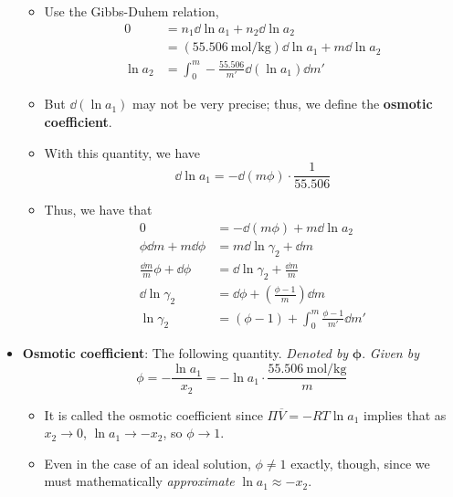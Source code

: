 \documentclass[../notes.tex]{subfiles}
\begin{document}
\begin{itemize}
    \begin{itemize}
        \item Use the Gibbs-Duhem relation,
        \begin{align*}
            0 &= n_1\dd{\ln a_1}+n_2\dd{\ln a_2}\\
            &= (\SI{55.506}{\mole\per\kilo\gram})\dd{\ln a_1}+m\dd{\ln a_2}\\
            \ln a_2 &= \int_0^m-\frac{55.506}{m'}\dd{(\ln a_1)}\dd{m'}
        \end{align*}
        \item But $\dd{(\ln a_1)}$ may not be very precise; thus, we define the \textbf{osmotic coefficient}.
        \item With this quantity, we have
        \begin{equation*}
            \dd{\ln a_1} = -\dd{(m\phi)}\cdot\frac{1}{55.506}
        \end{equation*}
        \item Thus, we have that
        \begin{align*}
            0 &= -\dd{(m\phi)}+m\dd{\ln a_2}\\
            \phi\dd{m}+m\dd{\phi} &= m\dd{\ln\gamma_2}+\dd{m}\\
            \frac{\dd{m}}{m}\phi+\dd{\phi} &= \dd{\ln\gamma_2}+\frac{\dd{m}}{m}\\
            \dd{\ln\gamma_2} &= \dd{\phi}+\left( \frac{\phi-1}{m} \right)\dd{m}\\
            \ln\gamma_2 &= (\phi-1)+\int_0^m\frac{\phi-1}{m'}\dd{m'}
        \end{align*}
    \end{itemize}
    \item \textbf{Osmotic coefficient}: The following quantity. \emph{Denoted by} $\bm{\phi}$. \emph{Given by}
    \begin{equation*}
        \phi = -\frac{\ln a_1}{x_2}
        = -\ln a_1\cdot\frac{\SI{55.506}{\mole\per\kilo\gram}}{m}
    \end{equation*}
    \begin{itemize}
        \item It is called the osmotic coefficient since $\Pi\overline{V}=-RT\ln a_1$ implies that as $x_2\to 0$, $\ln a_1\to -x_2$, so $\phi\to 1$.
        \item Even in the case of an ideal solution, $\phi\neq 1$ exactly, though, since we must mathematically \emph{approximate} $\ln a_1\approx -x_2$.
    \end{itemize}

\end{itemize}
\end{document}
